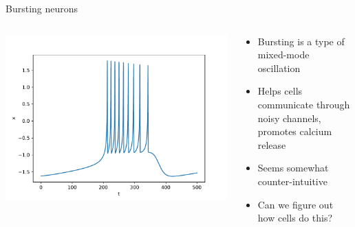 \documentclass[presentation]{beamer}
\begin{document}
\begin{frame}[label={sec:org1cff64b}]{Bursting neurons}
\begin{columns}
\begin{column}{0.5\columnwidth}
\includegraphics[width=1.2\textwidth]{./burst.pdf}
\end{column}

\begin{column}{0.5\columnwidth}
\begin{itemize}
\item Bursting is a type of mixed-mode oscillation
\item Helps cells communicate through noisy channels, promotes calcium release
\item Seems somewhat counter-intuitive
\item Can we figure out how cells do this?
\end{itemize}
\end{column}
\end{columns}
\end{frame}
\end{document}
